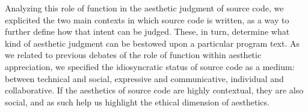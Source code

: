 Analyzing this role of function in the aesthetic judgment of source code, we explicited the two main contexts in which source code is written, as a way to further define how that intent can be judged. These, in turn, determine what kind of aesthetic judgment can be bestowed upon a particular program text. As we related to previous debates of the role of function within aesthetic appreciation, we specified the idiosyncratic status of source code as a medium: between technical and social, expressive and communicative, individual and collaborative. If the aesthetics of source code are highly contextual, they are also social, and as such help us highlight the ethical dimension of aesthetics.